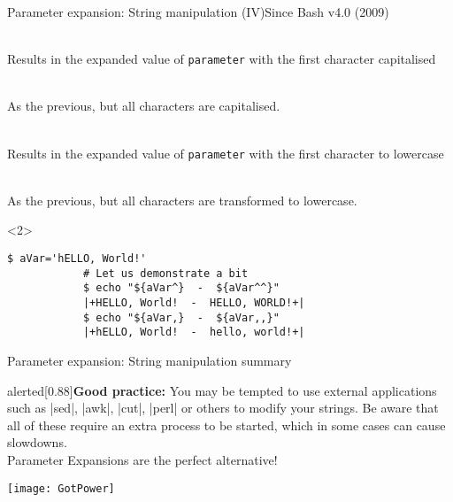 \begin{frame}[fragile]{Parameter expansion: String manipulation (IV)}{Since Bash v4.0 (2009)}
    \vspace{-3mm}
    \begin{description}
        \item[First uppercase:] \\
            {\small
                Results in the expanded value of \texttt{parameter} with the first character capitalised
            }
        \item[All uppercase:] \\
            {\small
                As the previous, but all characters are capitalised.
            }
        \item[First uppercase:] \\
            {\small
                Results in the expanded value of \texttt{parameter} with the first character to lowercase
            }
        \item[All lowercase:] \\
            {\small
                As the previous, but all characters are transformed to lowercase.
            }
    \end{description}
    \begin{uncoverenv}<2>
        \begin{lstlisting}[style=MyBash, style=oddnumbers, aboveskip=2mm]
            $ aVar='hELLO, World!'
            # Let us demonstrate a bit
            $ echo "${aVar^}  -  ${aVar^^}"
            |+HELLO, World!  -  HELLO, WORLD!+|
            $ echo "${aVar,}  -  ${aVar,,}"
            |+hELLO, World!  -  hello, world!+|
        \end{lstlisting}
    \end{uncoverenv}
\end{frame}
\begin{frame}{Parameter expansion: String manipulation summary}
    \vspace{-3mm}
    \begin{varblock}{alerted}[0.88\textwidth]{\textbf{Good practice:}}
        You may be tempted to use external applications such as \bash|sed|, \bash|awk|, \bash|cut|, \bash|perl| or others to modify your strings.
        Be aware that all of these require an extra process to be started, which in some cases can cause slowdowns.\\
        \alert{Parameter Expansions are the perfect alternative!}
    \end{varblock}
    \bigskip
    \centerline{\texttt{[image: GotPower]}}
\end{frame}
